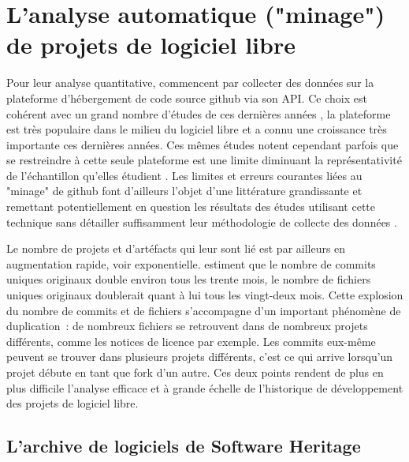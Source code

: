 \section{L'analyse automatique ("minage") de projets de logiciel libre}

Pour leur analyse quantitative, \textcite{signals-2019} commencent par collecter des données sur la plateforme
d'hébergement de code source \gls{github} via son \gls{API}. Ce choix est cohérent avec un grand nombre
d'études de ces dernières années , la plateforme est très populaire dans le
milieu du logiciel libre et a connu une croissance très importante ces dernières années. Ces mêmes études
notent cependant parfois que se restreindre à cette seule plateforme est une limite diminuant la
représentativité de l'échantillon qu'elles étudient . Les limites et erreurs
courantes liées au "minage" de \gls{github} font d'ailleurs l'objet d'une littérature grandissante et
remettant potentiellement en question les résultats des études utilisant cette technique sans détailler
suffisamment leur méthodologie de collecte des données .

Le nombre de projets et d'artéfacts qui leur sont lié est par ailleurs en augmentation rapide, voir
exponentielle.  estiment que le nombre de \glspl{commit} uniques originaux
double environ tous les trente mois, le nombre de fichiers uniques originaux doublerait quant à lui tous les
vingt-deux mois. Cette explosion du nombre de \glspl{commit} et de fichiers s'accompagne d'un important
phénomène de duplication : de nombreux fichiers se retrouvent dans de nombreux projets différents, comme les
notices de licence par exemple. Les \glspl{commit} eux-même peuvent se trouver dans plusieurs projets
différents, c'est ce qui arrive lorsqu'un projet débute en tant que \gls{fork} d'un autre. Ces deux points
rendent de plus en plus difficile l'analyse efficace et à grande échelle de l'historique de développement des
projets de logiciel libre.

\subsection{L'archive de logiciels de Software Heritage}
\label{ssec:swh-graph}

